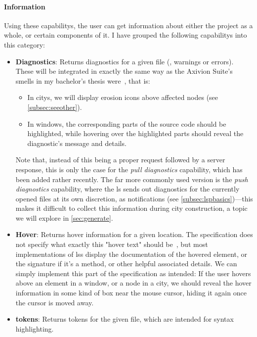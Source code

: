 \documentclass[../thesis]{subfiles}
\begin{document}
\paragraph{Information}
Using these \glspl{capability}, the user can get information about either the project as a whole, or certain components of it.
I have grouped the following \glspl{capability} into this category:
\begin{itemize}
	\item \textbf{Diagnostics}: Returns diagnostics for a given file (\eg, warnings or errors).
	      These will be integrated in exactly the same way as the Axivion Suite's \glspl{smell} in my bachelor's thesis were~\cite{galperin2021}, that is:
	      \begin{itemize}
		      \item In \glspl{city}, we will display erosion icons above affected nodes (see \cref{subsec:seeother}).
		      \item In \glspl{window}, the corresponding parts of the source code should be highlighted, while hovering over the highlighted parts should reveal the diagnostic's message and details.
	      \end{itemize}
	      Note that, instead of this being a proper request followed by a server response, this is only the case for the \emph{pull diagnostics} \gls{capability}, which has been added rather recently.
	      The far more commonly used version is the \emph{push diagnostics} \gls{capability}, where the \gls{ls} sends out diagnostics for the currently opened files at its own discretion, as notifications (see \cref{subsec:lspbasics})---this makes it difficult to collect this information during city construction, a topic we will explore in \cref{sec:generate}.
	\item \textbf{Hover}: Returns hover information for a given location.
	      The specification does not specify what exactly this "hover text" should be~\cite{lsp}, but most implementations of \glspl{ls} display the documentation of the hovered element, or the signature if it's a method, or other helpful associated details.
	      We can simply implement this part of the specification as intended:
	      If the user hovers above an element in a \gls{window}, or a node in a \gls{city}, we should reveal the hover information in some kind of box near the mouse cursor, hiding it again once the cursor is moved away.
	\item \textbf{\Glspl*{token}}: Returns \glspl*{token} for the given file, which are intended for syntax highlighting.

\end{itemize}
\end{document}
